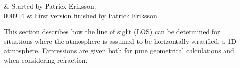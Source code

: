 %
%
 \label{sec:los}


%
%
 & Started by Patrick Eriksson. \\
  000914 & First version finished by Patrick Eriksson.\\
\stophistory


%
%
%



%
%
This section describes how the line of sight (LOS) can be determined
for situations where the atmosphere is assumed to be horizontally
stratified, a 1D atmosphere. Expressions are given both for pure
geometrical calculations and when considering refraction.



